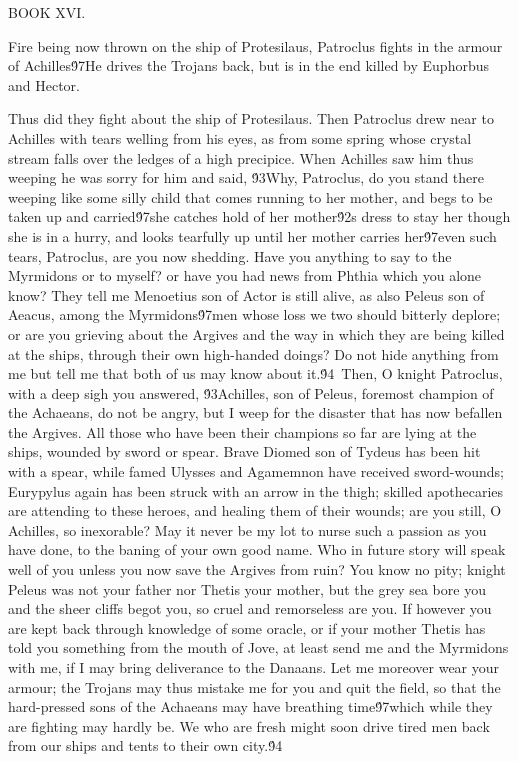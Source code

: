 {  BOOK XVI.\
\pard{}\qj{}

  Fire being now thrown on the ship of Protesilaus, Patroclus fights in the armour of Achilles\'97He drives the Trojans back, but is in the end killed by Euphorbus and Hector.\
\pard{}\qj{}

  Thus did they fight about the ship of Protesilaus. Then Patroclus drew near to Achilles with tears welling from his eyes, as from some spring whose crystal stream falls over the ledges of a high precipice. When Achilles saw him thus weeping he was sorry for him and said, \'93Why, Patroclus, do you stand there weeping like some silly child that comes running to her mother, and begs to be taken up and carried\'97she catches hold of her mother\'92s dress to stay her though she is in a hurry, and looks tearfully up until her mother carries her\'97even such tears, Patroclus, are you now shedding. Have you anything to say to the Myrmidons or to myself? or have you had news from Phthia which you alone know? They tell me Menoetius son of Actor is still alive, as also Peleus son of Aeacus, among the Myrmidons\'97men whose loss we two should bitterly deplore; or are you grieving about the Argives and the way in which they are being killed at the ships, through their own high-handed doings? Do not hide anything from me but tell me that both of us may know about it.\'94\
Then, O knight Patroclus, with a deep sigh you answered, \'93Achilles, son of Peleus, foremost champion of the Achaeans, do not be angry, but I weep for the disaster that has now befallen the Argives. All those who have been their champions so far are lying at the ships, wounded by sword or spear. Brave Diomed son of Tydeus has been hit with a spear, while famed Ulysses and Agamemnon have received sword-wounds; Eurypylus again has been struck with an arrow in the thigh; skilled apothecaries are attending to these heroes, and healing them of their wounds; are you still, O Achilles, so inexorable? May it never be my lot to nurse such a passion as you have done, to the baning of your own good name. Who in future story will speak well of you unless you now save the Argives from ruin? You know no pity; knight Peleus was not your father nor Thetis your mother, but the grey sea bore you and the sheer cliffs begot you, so cruel and remorseless are you. If however you are kept back through knowledge of some oracle, or if your mother Thetis has told you something from the mouth of Jove, at least send me and the Myrmidons with me, if I may bring deliverance to the Danaans. Let me moreover wear your armour; the Trojans may thus mistake me for you and quit the field, so that the hard-pressed sons of the Achaeans may have breathing time\'97which while they are fighting may hardly be. We who are fresh might soon drive tired men back from our ships and tents to their own city.\'94\
}
